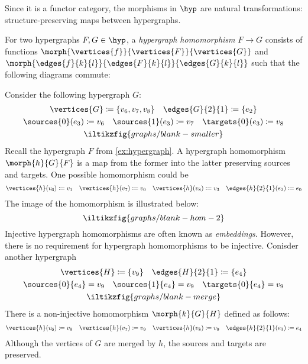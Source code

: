 Since it is a functor category, the morphisms in \(\hyp\) are natural
transformations: structure-preserving maps between hypergraphs.

\begin{definition}\label{def:hypergraph-homomorphism}
    For two hypergraphs \(F, G \in \hyp\), a \emph{hypergraph homomorphism}
    \(F \to G\) consists of functions
    \(\morph{\vertices{f}}{\vertices{F}}{\vertices{G}}\) and
    \(\morph{\edges{f}{k}{l}}{\edges{F}{k}{l}}{\edges{G}{k}{l}}\) such that the
    following diagrams commute:
    
\end{definition}

\begin{example}\label{ex:hypergraph-homomorphism}
    Consider the following hypergraph \(G\):
    \begin{gather*}
        \vertices{G} \coloneqq \{v_6,v_7,v_8\}
        \quad
        \edges{G}{2}{1} \coloneqq \{e_2\}
        \\
        \sources{0}(e_3) \coloneqq v_6
        \quad
        \sources{1}(e_3) \coloneqq v_7
        \quad
        \targets{0}(e_3) \coloneqq v_8
        \\
        \iltikzfig{graphs/blank-smaller}
    \end{gather*}
    Recall the hypergraph \(F\) from \cref{ex:hypergraph}.
    A hypergraph homomorphism \(\morph{h}{G}{F}\) is a map from the former into
    the latter preserving sources and targets.
    One possible homomorphism could be
    \begin{gather*}
        \vertices{h}(v_6) \coloneqq v_1
        \quad
        \vertices{h}(v_7) \coloneqq v_0
        \quad
        \vertices{h}(v_8) \coloneqq v_3
        \quad
        \edges{h}{2}{1}(e_2) \coloneqq e_0
    \end{gather*}
    The image of the homomorphism is illustrated below:
    \[
        \iltikzfig{graphs/blank-hom-2}
    \]
    Injective hypergraph homomorphisms are often known as \emph{embeddings}.
    However, there is no requirement for hypergraph homomorphisms to be
    injective.
    Conisder another hypergraph
    \begin{gather*}
        \vertices{H} \coloneqq \{v_9\}
        \quad
        \edges{H}{2}{1} \coloneqq \{e_4\}
        \\
        \sources{0}{e_4} = v_9
        \quad
        \sources{1}{e_4} = v_9
        \quad
        \targets{0}{e_4} = v_9
        \\
        \iltikzfig{graphs/blank-merge}
    \end{gather*}
    There is a non-injective homomorphism \(\morph{k}{G}{H}\) defined as
    follows:
    \begin{gather*}
        \vertices{h}(v_6) \coloneqq v_9
        \quad
        \vertices{h}(v_7) \coloneqq v_9
        \quad
        \vertices{h}(v_8) \coloneqq v_9
        \quad
        \edges{h}{2}{1}(e_3) \coloneqq e_4
    \end{gather*}
    Although the vertices of \(G\) are merged by \(h\), the sources and
    targets are preserved.
\end{example}

